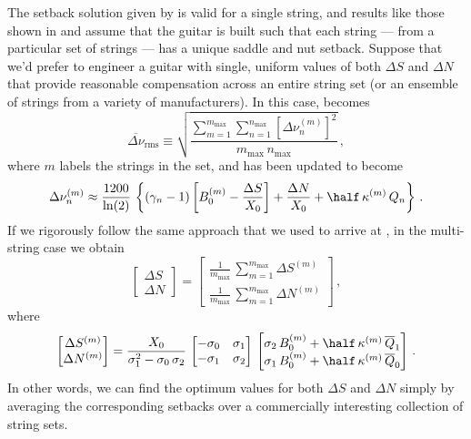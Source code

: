 The setback solution given by  is valid for a single string, and results like those shown in  and  assume that the guitar is built such that each string --- from a particular set of strings --- has a unique saddle and nut setback. Suppose that we'd prefer to engineer a guitar with single, uniform values of both $\Delta S$ and $\Delta N$ that provide reasonable compensation across an entire string set (or an ensemble of strings from a variety of manufacturers). In this case,  becomes
 \begin{equation}\label{eqn:rms_def_m}
\overline{\Delta \nu}_\text{rms} \equiv \sqrt{\frac{\sum_{m = 1}^{m_\text{max}} \sum_{n = 1}^{n_\text{max}} \left[\Delta \nu^{(m)}_{n}\right]^2}{m_\text{max}\, n_\text{max}}}\, ,
 \end{equation}
where $m$ labels the strings in the set, and  has been updated to become
 \begin{equation}\label{eqn:error_tot_m}
\Delta \nu^{(m)}_n \approx \frac{1200}{\ln(2)}\, \left\{ \left(\gamma_n - 1\right) \left[B_0^{(m)} - \frac{\Delta S}{X_0}\right] + \frac{\Delta N}{X_0} + \half\, \kappa^{(m)}\, Q_n \right\}\, .
 \end{equation}
If we rigorously follow the same approach that we used to arrive at , in the multi-string case we obtain
 \begin{equation}\label{eqn:rms_sol_multi}
\begin{bmatrix}
  \Delta S \\
  \Delta N
\end{bmatrix} = 
\begin{bmatrix}
  \frac{1}{m_\text{max}}\, \sum_{m = 1}^{m_\text{max}} \Delta S^{(m)} \\
  \frac{1}{m_\text{max}}\, \sum_{m = 1}^{m_\text{max}} \Delta N^{(m)}
\end{bmatrix}\, ,
 \end{equation}
where
 \begin{equation}\label{eqn:rms_sol_uni}
\begin{bmatrix}
  \Delta S^{(m)} \\
  \Delta N^{(m)}
\end{bmatrix} = \frac{X_0}{\sigma_1^2 - \sigma_0\, \sigma_2}\,
\begin{bmatrix}
  -\sigma_0 & \sigma_1 \\
  -\sigma_1 & \sigma_2
\end{bmatrix}\,
\begin{bmatrix}
  \sigma_2\, B_0^{(m)} + \half\, \kappa^{(m)}\, \overline{Q}_1 \\
  \sigma_1\, B_0^{(m)} + \half\, \kappa^{(m)}\, \overline{Q}_0
\end{bmatrix}\, .
 \end{equation}
In other words, we can find the optimum values for both $\Delta S$ and $\Delta N$ simply by averaging the corresponding setbacks over a commercially interesting collection of string sets.